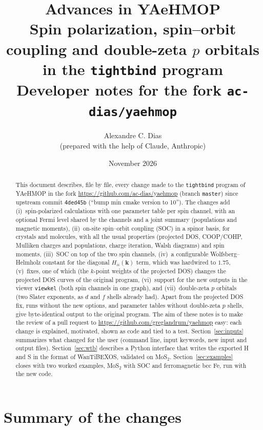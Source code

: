 \documentclass[11pt,a4paper]{article}
\title{\textbf{Advances in YAeHMOP}\\[4pt]
\Large Spin polarization, spin--orbit coupling and double-zeta $p$ orbitals in the \texttt{tightbind} program\\[4pt]
\large Developer notes for the fork \texttt{ac-dias/yaehmop}}
\author{Alexandre C. Dias\\(prepared with the help of Claude, Anthropic)}
\date{November 2026}
\begin{document}
\maketitle

\begin{abstract}
This document describes, file by file, every change made to the \texttt{tightbind}
program of YAeHMOP in the fork \url{https://github.com/ac-dias/yaehmop} (branch
\texttt{master}) since upstream commit \texttt{4ded45b} (``bump min cmake version
to 10''). The changes add (i)~spin-polarized calculations with one parameter table per
spin channel, with an optional Fermi level shared by the channels and a joint summary
(populations and magnetic moments), (ii)~on-site spin--orbit coupling (SOC) in a spinor
basis, for crystals and molecules, with all the usual properties (projected DOS,
COOP/COHP, Mulliken charges and populations, charge iteration, Walsh diagrams) and spin
moments, (iii)~SOC on top of the two spin channels, (iv)~a configurable
Wolfsberg--Helmholz constant for the diagonal $H_{ii}(\mathbf{k})$ term, which was
hardwired to $1.75$, (v)~fixes, one of which (the $k$-point weights of the projected DOS)
changes the projected DOS curves of the original program, (vi)~support for the new
outputs in the viewer \texttt{viewkel} (both spin channels in one graph), and
(vii)~double-zeta $p$ orbitals (two Slater exponents, as $d$ and $f$ shells already had).
Apart from the projected DOS fix, runs without the new options, and parameter tables
without double-zeta $p$ shells, give byte-identical output to the original program. The aim of these notes is to make the
review of a pull request to \url{https://github.com/greglandrum/yaehmop} easy: each
change is explained, motivated, shown as code and tied to a test. Section~\ref{sec:inputs}
summarizes what changed for the user (command line, input keywords, new input and
output files). Section~\ref{sec:wtb} describes a Python interface that writes the exported
H and S in the format of WanTiBEXOS, validated on MoS$_2$. Section~\ref{sec:examples}
closes with two worked examples, MoS$_2$ with SOC and ferromagnetic bcc Fe, run with the
new code.
\end{abstract}

\tableofcontents
\newpage

\section{Summary of the changes}
\end{document}
